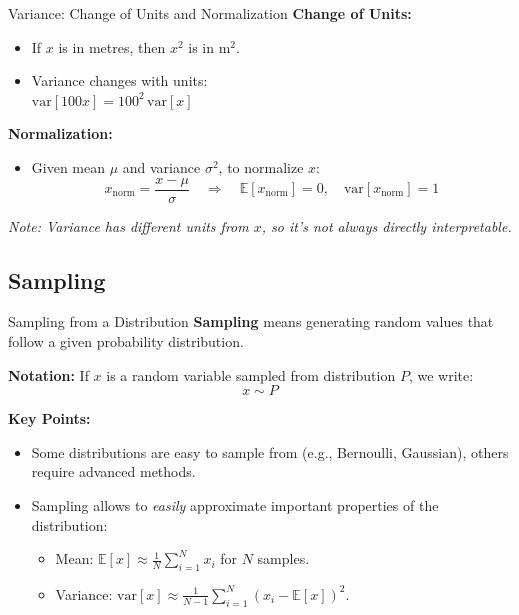 \documentclass{beamer}
\begin{document}
\begin{frame}{Variance: Change of Units and Normalization}
\textbf{Change of Units:}
\begin{itemize}
  \item If $x$ is in metres, then $x^2$ is in $\text{m}^2$.
  \item Variance changes with units: \\
  $\text{var}[100x] = 100^2 \, \text{var}[x]$
\end{itemize}

\vspace{1em}
\textbf{Normalization:}
\begin{itemize}
  \item Given mean $\mu$ and variance $\sigma^2$, to normalize $x$: \\
    \[
    x_{\text{norm}} = \frac{x - \mu}{\sigma} \quad \Rightarrow \quad \mathbb{E}[x_{\text{norm}}] = 0, \quad \text{var}[x_{\text{norm}}] = 1
    \]
\end{itemize}

\textit{Note: Variance has different units from $x$, so it's not always directly interpretable.}
\end{frame}

\subsection{Sampling}

\begin{frame}{Sampling from a Distribution}
\textbf{Sampling} means generating random values that follow a given probability distribution.

\vspace{1em}
\textbf{Notation:} If $x$ is a random variable sampled from distribution $P$, we write:
\[
x \sim P
\]

\vspace{1em}
\textbf{Key Points:}
\begin{itemize}
  \item Some distributions are easy to sample from (e.g., Bernoulli, Gaussian), others require advanced methods.
  \item Sampling allows to \textit{easily} approximate important properties of the distribution:
    \begin{itemize}
      \item Mean: $\mathbb{E}[x] \approx \frac{1}{N} \sum_{i=1}^{N} x_i$ for $N$ samples.
      \item Variance: $\text{var}[x] \approx \frac{1}{N-1} \sum_{i=1}^{N} (x_i - \mathbb{E}[x])^2$.
      \end{itemize}
      \end{itemize}
\end{frame}
\end{document}
